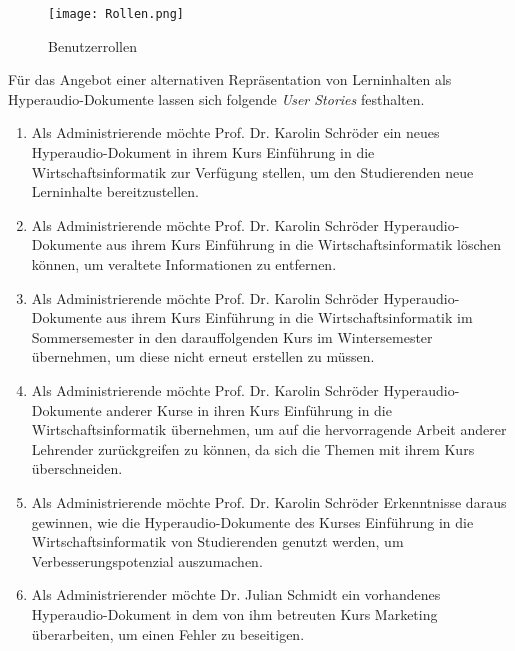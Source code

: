 \begin{figure}[h!]
\texttt{[image: Rollen.png]}
\caption{\label{fig:Rollen}Benutzerrollen}
\end{figure}


Für das Angebot einer alternativen Repräsentation von Lerninhalten als Hyperaudio-Dokumente lassen sich folgende \textit{User Stories} festhalten.

\begin{enumerate}[label=US-\arabic*:,ref=US-\arabic*]

\item \label{US-Admin-Erstellen} Als Administrierende möchte Prof. Dr. Karolin Schröder ein neues Hyperaudio-Dokument in ihrem Kurs \glqq Einführung in die Wirtschaftsinformatik\grqq{} zur Verfügung stellen, um den Studierenden neue Lerninhalte bereitzustellen.

\item \label{US-Admin-Loeschen} Als Administrierende möchte Prof. Dr. Karolin Schröder Hyperaudio-Dokumente aus ihrem Kurs \glqq Einführung in die Wirtschaftsinformatik\grqq{} löschen können, um veraltete Informationen zu entfernen.

\item \label{US-Admin-Semester} Als Administrierende möchte Prof. Dr. Karolin Schröder Hyperaudio-Dokumente aus ihrem Kurs \glqq Einführung in die Wirtschaftsinformatik\grqq{} im Sommersemester in den darauffolgenden Kurs im Wintersemester übernehmen, um diese nicht erneut erstellen zu müssen.

\item \label{US-Admin-Kurs} Als Administrierende möchte Prof. Dr. Karolin Schröder Hyperaudio-Dokumente anderer Kurse in ihren Kurs \glqq Einführung in die Wirtschaftsinformatik\grqq{} übernehmen, um auf die hervorragende Arbeit anderer Lehrender zurückgreifen zu können, da sich die Themen mit ihrem Kurs überschneiden.

\item \label{US-Admin-Statistik} Als Administrierende möchte Prof. Dr. Karolin Schröder Erkenntnisse daraus gewinnen, wie die Hyperaudio-Dokumente des Kurses \glqq Einführung in die Wirtschaftsinformatik\grqq{} von Studierenden genutzt werden, um Verbesserungspotenzial auszumachen.

\item \label{US-Admin-Bearbeiten} Als Administrierender möchte Dr. Julian Schmidt ein vorhandenes Hyperaudio-Dokument in dem von ihm betreuten Kurs \glqq Marketing\grqq{} überarbeiten, um einen Fehler zu beseitigen.


\end{enumerate}
